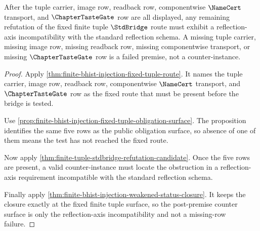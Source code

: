 \begin{theorem}
\label{thm:finite-bhist-injection-stdbridge-counter-surface}
After the tuple carrier, image row, readback row, componentwise $\NameCert$ transport, and $\ChapterTasteGate$ row are all displayed, any remaining refutation of the fixed finite tuple $\StdBridge$ route must exhibit a reflection-axis incompatibility with the standard reflection schema. A missing tuple carrier, missing image row, missing readback row, missing componentwise transport, or missing $\ChapterTasteGate$ row is a failed premise, not a counter-instance.
\end{theorem}
\begin{proof}
Apply \autoref{thm:finite-bhist-injection-fixed-tuple-route}. It names the tuple carrier, image row, readback row, componentwise $\NameCert$ transport, and $\ChapterTasteGate$ row as the fixed route that must be present before the bridge is tested.

Use \autoref{prop:finite-bhist-injection-fixed-tuple-obligation-surface}. The proposition identifies the same five rows as the public obligation surface, so absence of one of them means the test has not reached the fixed route.

Now apply \autoref{thm:finite-tuple-stdbridge-refutation-candidate}. Once the five rows are present, a valid counter-instance must locate the obstruction in a reflection-axis requirement incompatible with the standard reflection schema.

Finally apply \autoref{thm:finite-bhist-injection-weakened-status-closure}. It keeps the closure exactly at the fixed finite tuple surface, so the post-premise counter surface is only the reflection-axis incompatibility and not a missing-row failure.
\end{proof}

